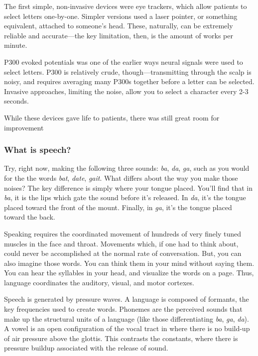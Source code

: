 The first simple, non-invasive devices were eye trackers, which allow patients to select letters one-by-one. Simpler versions used a laser pointer, or something equivalent, attached to someone's head. These, naturally, can be extremely reliable and accurate---the key limitation, then, is the amount of works per minute. \newline

P300 evoked potentials was one of the earlier ways neural signals were used to select letters. P300 is relatively crude, though---transmitting through the scalp is noisy, and requires averaging many P300s together before a letter can be selected. Invasive approaches, limiting the noise, allow you to select a character every 2-3 seconds. \newline

While these devices gave life to patients, there was still great room for improvement



\subsubsection{What is speech?}

Try, right now, making the following three sounds: \textit{ba}, \textit{da}, \textit{ga}, such as you would for the the words \textit{bat}, \textit{date}, \textit{gait}. What differs about the way you make those noises? The key difference is simply where your tongue placed. You'll find that in \textit{ba}, it is the lips which gate the sound before it's released. In \textit{da}, it's the tongue placed toward the front of the mount. Finally, in \textit{ga}, it's the tongue placed toward the back. \newline

Speaking requires the coordinated movement of hundreds of very finely tuned muscles in the face and throat. Movements which, if one had to think about, could never be accomplished at the normal rate of conversation. But, you can also imagine those words. You can think them in your mind without saying them. You can hear the syllables in your head, and visualize the words on a page. Thus, language coordinates the auditory, visual, and motor cortexes. \newline

Speech is generated by pressure waves. A language is composed of formants, the key frequencies used to create words. Phonemes are the perceived sounds that make up the structural units of a language (like those differentiating \textit{ba}, \textit{ga}, \textit{da}). A vowel is an open configuration of the vocal tract in where there is no build-up of air pressure above the glottis. This contrasts the constants, where there is pressure buildup associated with the release of sound. \newline

